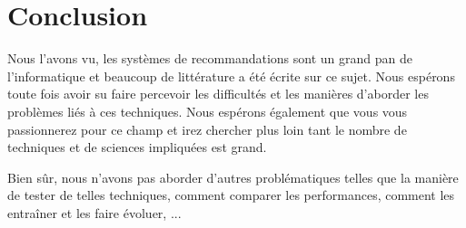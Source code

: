 \section{Conclusion}

Nous l'avons vu, les systèmes de recommandations sont un grand pan de l'informatique et beaucoup de littérature a été écrite sur ce sujet. Nous espérons toute fois avoir su faire percevoir les difficultés et les manières d'aborder les problèmes liés à ces techniques. Nous espérons également que vous vous passionnerez pour ce champ et irez chercher plus loin tant le nombre de techniques et de sciences impliquées est grand.

Bien sûr, nous n'avons pas aborder d'autres problématiques telles que la manière de tester de telles techniques, comment comparer les performances, comment les entraîner et les faire évoluer, ...

\begin{footnotesize}


\end{footnotesize}